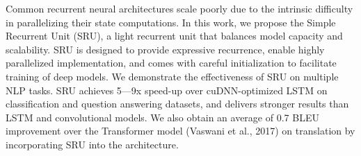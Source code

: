 Common recurrent neural architectures scale poorly due to the intrinsic difficulty in parallelizing their state computations. In this work, we propose the Simple Recurrent Unit (SRU), a light recurrent unit that balances model capacity and scalability. SRU is designed to provide expressive recurrence, enable highly parallelized implementation, and comes with careful initialization to facilitate training of deep models. We demonstrate the effectiveness of SRU on multiple NLP tasks. SRU achieves 5---9x speed-up over cuDNN-optimized LSTM on classification and question answering datasets, and delivers stronger results than LSTM and convolutional models. We also obtain an average of 0.7 BLEU improvement over the Transformer model (Vaswani et al., 2017) on translation by incorporating SRU into the architecture.
